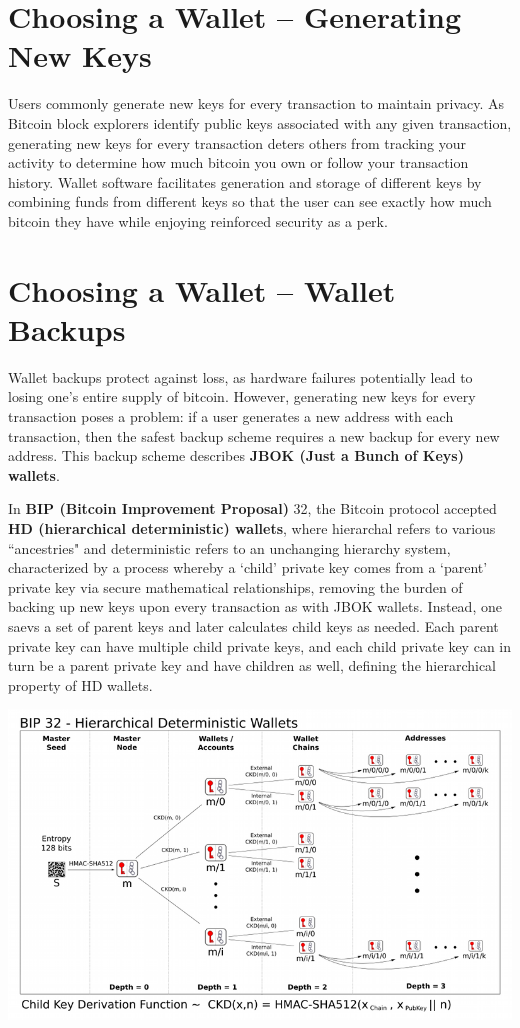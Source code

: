\documentclass[11pt]{article}
\begin{document}
    \section*{Choosing a Wallet -- Generating New Keys}
    
    Users commonly generate new keys for every transaction to maintain privacy. As Bitcoin block explorers identify public keys associated with any given transaction, generating new keys for every transaction deters others from tracking your activity to determine how much bitcoin you own or follow your transaction history. Wallet software facilitates generation and storage of different keys by combining funds from different keys so that the user can see exactly how much bitcoin they have while enjoying reinforced security as a perk.
    
    \section*{Choosing a Wallet -- Wallet Backups}
    
    Wallet backups protect against loss, as hardware failures potentially lead to losing one's entire supply of bitcoin. However, generating new keys for every transaction poses a problem: if a user generates a new address with each transaction, then the safest backup scheme requires a new backup for every new address. This backup scheme describes \textbf{JBOK (Just a Bunch of Keys) wallets}.
    
    In \textbf{BIP (Bitcoin Improvement Proposal)} 32, the Bitcoin protocol accepted \textbf{HD (hierarchical deterministic) wallets}, where hierarchal refers to various ``ancestries" and deterministic refers to an unchanging hierarchy system, characterized by a process whereby a `child' private key comes from a `parent' private key via secure mathematical relationships, removing the burden of backing up new keys upon every transaction as with JBOK wallets. Instead, one saevs a set of parent keys and later calculates child keys as needed. Each parent private key can have multiple child private keys, and each child private key can in turn be a parent private key and have children as well, defining the hierarchical property of HD wallets.  

   \includegraphics[scale=3.5]{bip32}
   
\end{document}

